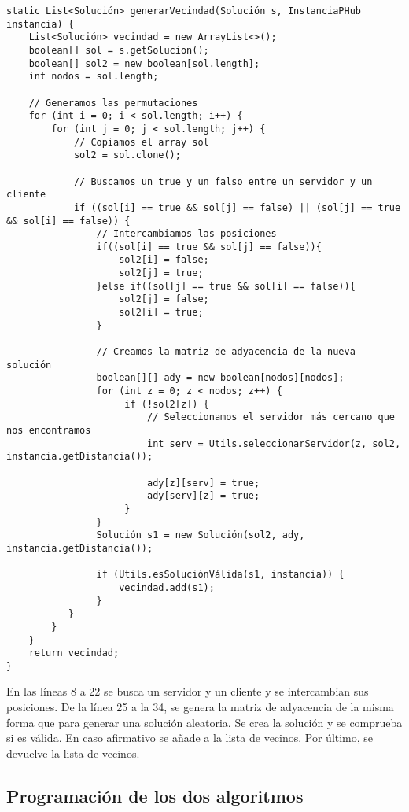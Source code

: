 \documentclass[12pt,a4paper,twoside,openright,titlepage,final]{article}
\begin{document}
\begin{verbatim}
static List<Solución> generarVecindad(Solución s, InstanciaPHub instancia) {
    List<Solución> vecindad = new ArrayList<>();
    boolean[] sol = s.getSolucion();
    boolean[] sol2 = new boolean[sol.length];
    int nodos = sol.length;
	
	// Generamos las permutaciones
    for (int i = 0; i < sol.length; i++) {
        for (int j = 0; j < sol.length; j++) {
            // Copiamos el array sol
            sol2 = sol.clone();

            // Buscamos un true y un falso entre un servidor y un cliente
            if ((sol[i] == true && sol[j] == false) || (sol[j] == true && sol[i] == false)) {	
                // Intercambiamos las posiciones
                if((sol[i] == true && sol[j] == false)){
                    sol2[i] = false;
                    sol2[j] = true;
                }else if((sol[j] == true && sol[i] == false)){
                    sol2[j] = false;
                    sol2[i] = true;
                }
						
                // Creamos la matriz de adyacencia de la nueva solución
                boolean[][] ady = new boolean[nodos][nodos];
                for (int z = 0; z < nodos; z++) {
                     if (!sol2[z]) {
                         // Seleccionamos el servidor más cercano que nos encontramos
                         int serv = Utils.seleccionarServidor(z, sol2, instancia.getDistancia());
                     
                         ady[z][serv] = true;
                         ady[serv][z] = true;
                     }	
                }			
                Solución s1 = new Solución(sol2, ady, instancia.getDistancia());

                if (Utils.esSoluciónVálida(s1, instancia)) {
                    vecindad.add(s1);
                }
           }
        }
    }
    return vecindad;
}

\end{verbatim}

En las líneas 8 a 22 se busca un servidor y un cliente y se intercambian sus posiciones. De la línea 25 a la 34, se genera la matriz de adyacencia de la misma forma que para generar una solución aleatoria. Se crea la solución y se comprueba si es válida. En caso afirmativo se añade a la lista de vecinos. Por último, se devuelve la lista de vecinos.

\subsection{Programación de los dos algoritmos}
\end{document}
